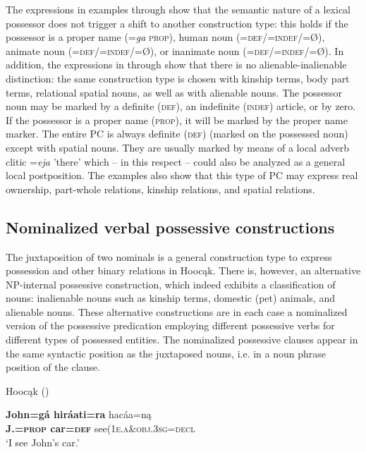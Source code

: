 \documentclass[output=paper]{LSP/langsci}
\begin{document}
The expressions in examples  through  show that the semantic nature of a lexical possessor does not trigger a shift to another construction type: this holds if the possessor is a proper name (=\textit{ga} \textsc{prop}), human noun (=\textsc{def/=indef/}=Ø), animate noun (=\textsc{def/=indef}/=Ø), or inanimate noun (=\textsc{def/=indef}/=Ø). In addition, the expressions in  through  show that there is no alienable-inalienable distinction: the same construction type is chosen with kinship terms, body part terms, relational spatial nouns, as well as with alienable nouns. The possessor noun may be marked by a definite (\textsc{def}), an indefinite (\textsc{indef}) article, or by zero. If the possessor is a proper name (\textsc{prop}), it will be marked by the proper name marker. The entire PC is always definite (\textsc{def}) (marked on the possessed noun) except with spatial nouns. They are usually marked by means of a local adverb clitic =\textit{eja} 'there' which – in this respect – could also be analyzed as a general local postposition. The examples also show that this type of PC may express real ownership, part-whole relations, kinship relations, and spatial relations.

\subsection{Nominalized verbal possessive constructions}\label{sec:helmbrecht:3.2}
The juxtaposition of two nominals is a general construction type to express possession and other binary relations in Hoocąk. There is, however, an alternative NP-internal possessive construction, which indeed exhibits a classification of nouns: inalienable nouns such as kinship terms, domestic (pet) animals, and alienable nouns. These alternative constructions are in each case a nominalized version of the possessive predication employing different possessive verbs for different types of possessed entities. The nominalized possessive clauses appear in the same syntactic position as the juxtaposed nouns, i.e. in a noun phrase position of the clause. 

\ea Hoocąk (\citealt[16]{Helmbrecht2003}) \label{seecar}

\ea 
\gll \textbf{John=g\'a hir\'aati=ra}  hac\'aa=n\k{a} \\
\textbf{J.=\textsc{prop} car=\textsc{def}} see(\textsc{1e.a}\&\textsc{obj.3sg}=\textsc{decl} \\
\glt `I see John's car.'  
\end{document}
